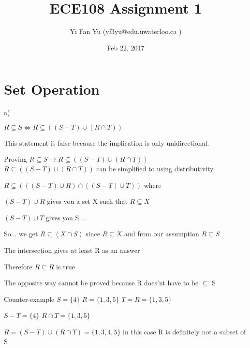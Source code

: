 \documentclass[a4paper,12pt]{article}
\begin{document}
\title{ECE108 Assignment 1}
\author{Yi Fan Yu (yf3yu@edu.uwaterloo.ca ) }
\date{Feb 22, 2017}
\maketitle


\section{Set Operation}


a)
\begin{flushleft}

$R \subseteq  S \iff R \subseteq  ((S - T) \cup (R \cap T))$ 


This statement is false because the implication is only unidirectional. 
\bigskip



Proving $R \subseteq  S \rightarrow R \subseteq  ((S - T) \cup (R \cap T)) $ \\ 



$R \subseteq  ((S - T) \cup (R \cap T))$ can be simplified to using distributivity
\bigskip

$R \subseteq ( (( S - T )\cup R )\cap( ( S - T )\cup T) ) $ where


$( S - T )\cup R$ gives you a set X such that $R \subseteq X$

$ ( S - T )\cup T$  gives you S ...
\bigskip

	So... we get $ R \subseteq  (X \cap S) $ 
since $R \subseteq X$ and from our assumption $R \subseteq S$

The intersection gives at least R as an answer

Therefore
$R \subseteq  R$ is true 
 
\bigskip
The opposite way cannot be proved because R does'nt have to be  $\subseteq$ S

Counter-example $ S = \{4\}$
$R = \{1,3,5\}$
$T = R = \{1,3,5\}$

$S-T = \{4\}$
$R \cap T = \{1,3,5\}$

$ R = (S - T) \cup (R \cap T) = \{1,3,4,5\}$ 
in this case R is definitely not a subset of S



\end{flushleft}
\end{document}
